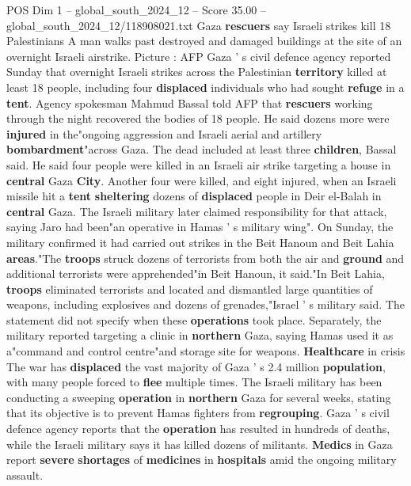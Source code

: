 \begin{textsample}{POS Dim 1 – global\_south\_2024\_12 – Score 35.00 – global\_south\_2024\_12/118908021.txt}  \label{ex:f1_pos_104}
Gaza \textbf{rescuers} say Israeli strikes kill 18 Palestinians A man walks past destroyed and damaged buildings at the site of an overnight Israeli airstrike.
Picture : AFP Gaza ' s civil defence agency reported Sunday that overnight Israeli strikes across the Palestinian \textbf{territory} killed at least 18 people, including four \textbf{displaced} individuals who had sought \textbf{refuge} in a \textbf{tent}.
Agency spokesman Mahmud Bassal told AFP that \textbf{rescuers} working through the night recovered the bodies of 18 people.
He said dozens more were \textbf{injured} in the"ongoing aggression and Israeli aerial and artillery \textbf{bombardment}"across Gaza.
The dead included at least three \textbf{children}, Bassal said.
He said four people were killed in an Israeli air strike targeting a house in \textbf{central} Gaza \textbf{City}.
Another four were killed, and eight injured, when an Israeli missile hit a \textbf{tent} \textbf{sheltering} dozens of \textbf{displaced} people in Deir el-Balah in \textbf{central} Gaza.
The Israeli military later claimed responsibility for that attack, saying Jaro had been"an operative in Hamas ' s military wing".
On Sunday, the military confirmed it had carried out strikes in the Beit Hanoun and Beit Lahia \textbf{areas}."The \textbf{troops} struck dozens of terrorists from both the air and \textbf{ground} and additional terrorists were apprehended"in Beit Hanoun, it said."In Beit Lahia, \textbf{troops} eliminated terrorists and located and dismantled large quantities of weapons, including explosives and dozens of grenades,"Israel ' s military said.
The statement did not specify when these \textbf{operations} took place.
Separately, the military reported targeting a clinic in \textbf{northern} Gaza, saying Hamas used it as a"command and control centre"and storage site for weapons. \textbf{Healthcare} in crisis The war has \textbf{displaced} the vast majority of Gaza ' s 2.4 million \textbf{population}, with many people forced to \textbf{flee} multiple times.
The Israeli military has been conducting a sweeping \textbf{operation} in \textbf{northern} Gaza for several weeks, stating that its objective is to prevent Hamas fighters from \textbf{regrouping}.
Gaza ' s civil defence agency reports that the \textbf{operation} has resulted in hundreds of deaths, while the Israeli military says it has killed dozens of militants. \textbf{Medics} in Gaza report \textbf{severe} \textbf{shortages} of \textbf{medicines} in \textbf{hospitals} amid the ongoing military assault.

\end{textsample}
